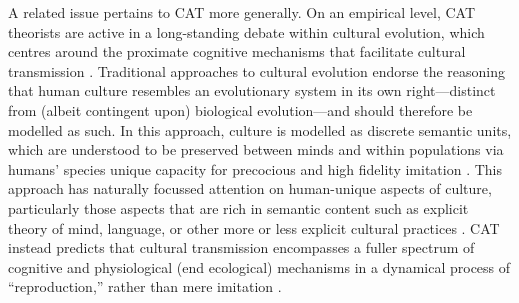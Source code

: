 \begin{CJK}{UTF8}{gbsn}
A related issue pertains to CAT more generally.  On an empirical level, CAT theorists are active in a long-standing debate within cultural evolution, which centres around the proximate cognitive mechanisms that facilitate cultural transmission \citep{Acerbi2015,Scott-Phillips2018}.  Traditional approaches to cultural evolution endorse the reasoning that human culture resembles an evolutionary system in its own right---distinct from (albeit contingent upon) biological evolution---and should therefore be modelled as such.  In this approach, culture is modelled as discrete semantic units, which are understood to be preserved between minds and within populations via humans' species unique capacity for precocious and high fidelity imitation \citep[i.e., like genes, culture is preserved through processes of exact replication with natural copying error and drift][]{Henrich2003,Tomasello2011}. This approach has naturally focussed attention on human-unique aspects of culture, particularly those aspects that are rich in semantic content such as explicit theory of mind, language, or other more or less explicit cultural practices \citep{Tomasello2005}.  CAT instead predicts that cultural transmission encompasses a fuller spectrum of cognitive and physiological (end ecological) mechanisms in a dynamical process of ``reproduction,'' rather than mere imitation \citep{Claidiere2007,Mesoudi2017}.


\end{CJK}
